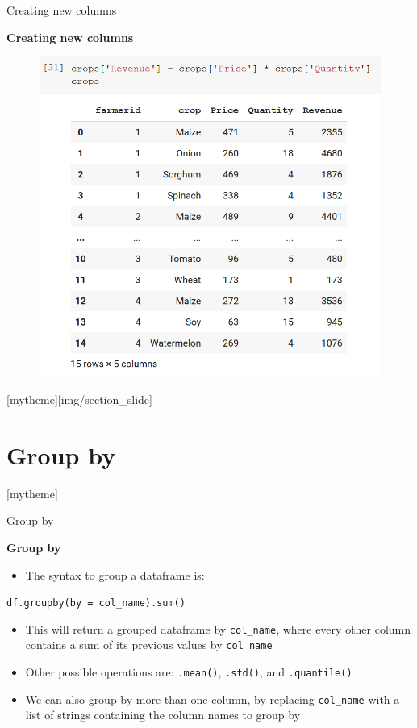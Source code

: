\documentclass[aspectratio=169]{beamer}
\newcommand{\sectionpic}[2]{
	\setbeamertemplate{section page}[mytheme][#2]
	\section{#1}
	\setbeamertemplate{section page}[mytheme]
}
\begin{document}
\begin{frame}{Creating new columns}

	\textbf{Creating new columns}

	\begin{figure}
		\centering
		\includegraphics[width=0.5\linewidth]{img/column_generation.png}
	\end{figure}

\end{frame}

\sectionpic{Group by}{img/section_slide}

\begin{frame}{Group by}

	\textbf{Group by}

	\begin{itemize}
		\item The syntax to group a dataframe is:
	\end{itemize}

	\hspace{7mm} \texttt{df.groupby(by = col\_name).sum()}

	\begin{itemize}
		\item This will return a grouped dataframe by \texttt{col\_name}, where every other column contains a sum of its previous values by \texttt{col\_name}
		\item Other possible operations are: \texttt{.mean()}, \texttt{.std()}, and \texttt{.quantile()}
		\item We can also group by more than one column, by replacing \texttt{col\_name} with a list of strings containing the column names to group by
	\end{itemize}

\end{frame}
\end{document}
